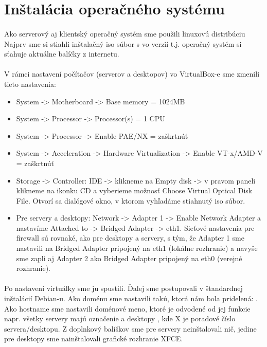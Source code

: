 \section{Inštalácia operačného systému}
\paragraph{}
Ako serverový aj klientský operačný systém sme použili linuxovú distribúciu Najprv sme si stiahli inštalačný iso súbor s  vo verzií  t.j. operačný systém si sťahuje aktuálne balíčky z internetu.
\paragraph{}
V rámci nastavení počítačov (serverov a desktopov) vo VirtualBox-e sme zmenili tieto nastavenia:
\begin{itemize}
\item System -\textgreater{} Motherboard -\textgreater{} Base memory = 1024MB
\item System -\textgreater{} Processor -\textgreater{} Processor(s) = 1 CPU
\item System -\textgreater{} Processor -\textgreater{} Enable PAE/NX = zaškrtnúť
\item System -\textgreater{} Acceleration -\textgreater{} Hardware Virtualization -\textgreater{} Enable VT-x/AMD-V = zaškrtnúť
\item Storage -\textgreater{} Controller: IDE -\textgreater{} klikneme na Empty disk -\textgreater{} v pravom paneli klikneme na ikonku CD a vyberieme možnosť Choose Virtual Optical Disk File. Otvorí sa dialógové okno, v ktorom vyhľadáme stiahnutý iso súbor.
\item Pre servery a desktopy: Network -\textgreater{} Adapter 1 -\textgreater{} Enable Network Adapter a nastavíme Attached to -\textgreater{} Bridged Adapter -\textgreater{} eth1. Sieťové nastavenia pre firewall sú rovnaké, ako pre desktopy a servery, s tým, že Adapter 1 sme nastavili na Bridged Adapter pripojený na eth1 (lokálne rozhranie) a navyše sme zapli aj Adapter 2 ako Bridged Adapter pripojený na eth0 (verejné rozhranie).
\end{itemize}

\paragraph{}
Po nastavení virtuálky sme ju spustili. Ďalej sme postupovali v štandardnej inštalácií Debian-u. Ako doménu sme nastavili takú, ktorá nám bola pridelená: . Ako hostname sme nastavili doménové meno, ktoré je odvodené od jej funkcie napr. všetky servery majú označenie  a desktopy , kde X je poradové číslo servera/desktopu. Z doplnkový balíškov sme pre servery neinštalovali nič, jedine pre desktopy sme nainštalovali grafické rozhranie XFCE.

